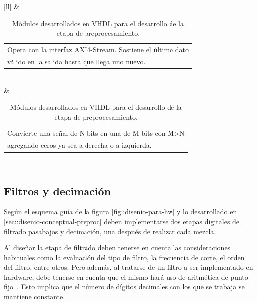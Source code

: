 \documentclass[../../main.tex]{subfiles}
\begin{document}
\begin{table}[H]
{\begin{tabular}{|ll|}
           & \begin{tabular}[c]{@{}l@{}}Opera con la interfaz AXI4-Stream. Sostiene el último dato\\ válido en la salida hasta que llega uno nuevo.\end{tabular}                                                                                                                                                                      \\ \hline
                                                           & \begin{tabular}[c]{@{}l@{}}Convierte una señal de N bits en una de M bits con M\textgreater{}N\\ agregando ceros ya sea a derecha o a izquierda.\end{tabular}                                                                                                                                                            \\ \hline
    \end{tabular}%
    }
    \caption{Módulos desarrollados en VHDL para el desarrollo de la etapa de preprocesamiento.}
    \label{tab::ip-fran}
    \end{table}

\subsection{Filtros y decimación}\label{subsec::filtros-decimacion}
Según el esquema guía de la figura \ref{fig::disenio-para-hw} y lo desarrollado en \ref{sec::disenio-conceptual-preproc} deben implementarse dos etapas digitales de filtrado pasabajos y decimación, una después de realizar cada mezcla. 

Al diseñar la etapa de filtrado deben tenerse en cuenta las consideraciones habituales  como la evaluación del tipo de filtro, la frecuencia de corte, el orden del filtro, entre otros. Pero además, al tratarse de un filtro a ser implementado en hardware, debe tenerse en cuenta que el mismo hará uso de aritmética de punto fijo~\cite{pto-fijo}. Esto implica que el número de dígitos decimales con los que se trabaja se mantiene constante.
\end{document}
